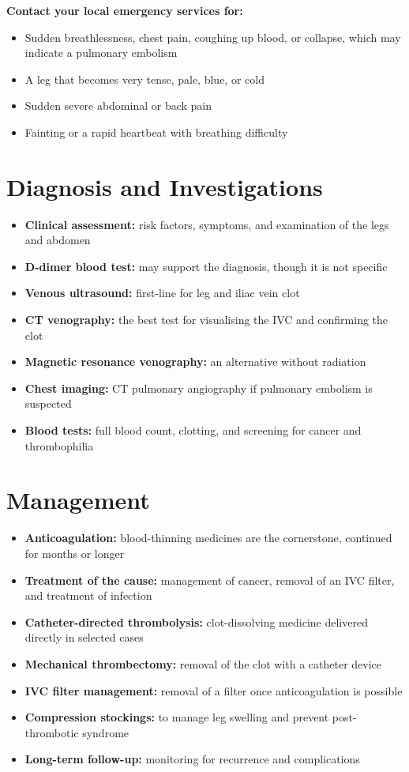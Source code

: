 \textbf{Contact your local emergency services for:}
\begin{itemize}
    \item Sudden breathlessness, chest pain, coughing up blood, or collapse, which may indicate a pulmonary embolism
    \item A leg that becomes very tense, pale, blue, or cold
    \item Sudden severe abdominal or back pain
    \item Fainting or a rapid heartbeat with breathing difficulty
\end{itemize}

\section*{Diagnosis and Investigations}
\begin{itemize}
    \item \textbf{Clinical assessment:} risk factors, symptoms, and examination of the legs and abdomen
    \item \textbf{D-dimer blood test:} may support the diagnosis, though it is not specific
    \item \textbf{Venous ultrasound:} first-line for leg and iliac vein clot
    \item \textbf{CT venography:} the best test for visualising the IVC and confirming the clot
    \item \textbf{Magnetic resonance venography:} an alternative without radiation
    \item \textbf{Chest imaging:} CT pulmonary angiography if pulmonary embolism is suspected
    \item \textbf{Blood tests:} full blood count, clotting, and screening for cancer and thrombophilia
\end{itemize}

\section*{Management}
\begin{itemize}
    \item \textbf{Anticoagulation:} blood-thinning medicines are the cornerstone, continued for months or longer
    \item \textbf{Treatment of the cause:} management of cancer, removal of an IVC filter, and treatment of infection
    \item \textbf{Catheter-directed thrombolysis:} clot-dissolving medicine delivered directly in selected cases
    \item \textbf{Mechanical thrombectomy:} removal of the clot with a catheter device
    \item \textbf{IVC filter management:} removal of a filter once anticoagulation is possible
    \item \textbf{Compression stockings:} to manage leg swelling and prevent post-thrombotic syndrome
    \item \textbf{Long-term follow-up:} monitoring for recurrence and complications
\end{itemize}

